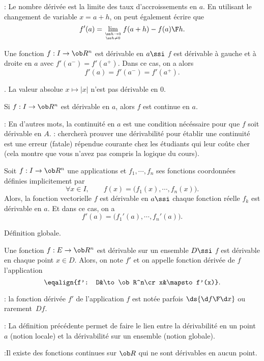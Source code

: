\Remarque : Le nombre d\'eriv\'ee est la limite des taux d'accroissements en $a$. En utilisant le changement de variable $x=a+h$, on peut \'egalement \'ecrire que 
$$
f'(a)=\lim_{\ss h\to 0\atop\ss h\neq 0}{f(a+h)-f(a)\F h}. 
$$

Une fonction $f:I\to\ob R^n$ est d\'erivable en $a\ssi$ $f$ est d\'erivable \`a gauche et \`a droite en $a$ avec $f'(a^-)=f'(a^+)$. 
Dans ce cas, on a alors
$$
f'(a)=f'(a^-)=f'(a^+).
$$

\Exemple. La valeur absolue $x\mapsto|x|$ n'est pas d\'erivable en $0$. 
\bigskip

\Propriete [$a\in I$ intervalle] 
Si $f:I\to\ob R^n$ est d\'erivable en $a$, alors $f$ est continue en $a$. 

\Remarque : En d'autres mots, la continuit\'e en $a$ est une condition n\'ec\'essaire pour que $f$ soit d\'erivable en $A$. 
\bigskip
\Remarque : chercher\`a prouver une d\'erivabilit\'e pour \'etablir une continuit\'e est une erreur (fatale) r\'ependue courante chez les \'etudiants qui leur co\^ute cher (cela montre que vous n'avez pas compris la logique du cours). 
\bigskip

Soit $f:I\to\ob R^n$ une applications et $f_1, \cdots, f_n$ ses fonctions coordonn\'ees d\'efinies implicitement par  
$$
\forall x\in I,\qquad f(x)=\Big(f_1(x),\cdots, f_n(x)\Big).
$$
Alors, la fonction vectorielle $f$ est d\'erivable en $a\ssi$ chaque fonction r\'eelle $f_k$ est d\'e\-ri\-va\-ble en $a$. 
Et dans ce cas, on a 
$$
f'(a)=\Big(f_1'(a),\cdots, f_n'(a)\Big).
$$

\Concept D\'efinition globale. 

Une fonction $f:E\to\ob R^n$ est d\'erivable sur un ensemble $D\ssi$ $f$ est d\'erivable en chaque point $x\in D$. 
Alors, on note $f'$ et on appelle fonction d\'eriv\'ee de $f$ l'application 
$$
\eqalign{f': D&\to\ob R^n\cr x&\mapsto f'(x)}.
$$ 

: la fonction d\'eriv\'ee $f'$ de l'application $f$ est not\'ee parfois $\ds {\d f\F \d x}$ ou rarement~$Df$. 
\bigskip

: La d\'efinition pr\'ec\'edente permet de faire le lien entre la d\'erivabilit\'e en un point $a$ (notion locale) et la d\'erivabilit\'e sur un ensemble (notion globale). 
\bigskip

:Il existe des fonctions continues sur $\ob R$ qui ne sont d\'erivables en aucun point. 

